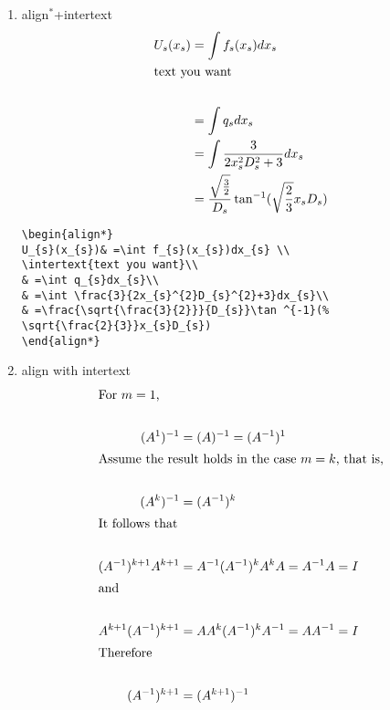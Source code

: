 \begin{enumerate}
\begin{lstlisting}[language=Tex]
\begin{equation*}
g(\lambda ,\nu )=
\begin{cases} -\lambda ^{T}h-\nu ^{T}b & c^{T}+\lambda ^{T}G+\nu ^{T}A=0
\\
-\infty &\text{otherwise.}
\end{cases}
\end{equation*}
\end{lstlisting}

\item align$^{\ast}$+intertext
\begin{align*}
U_{s}(x_{s})& =\int f_{s}(x_{s})dx_{s} \\
\intertext{text you want}\\
& =\int q_{s}dx_{s}\\
& =\int \frac{3}{2x_{s}^{2}D_{s}^{2}+3}dx_{s}\\
& =\frac{\sqrt{\frac{3}{2}}}{D_{s}}\tan ^{-1}(%
\sqrt{\frac{2}{3}}x_{s}D_{s})
\end{align*}

\begin{lstlisting}[language=Tex]
\begin{align*}
U_{s}(x_{s})& =\int f_{s}(x_{s})dx_{s} \\
\intertext{text you want}\\
& =\int q_{s}dx_{s}\\
& =\int \frac{3}{2x_{s}^{2}D_{s}^{2}+3}dx_{s}\\
& =\frac{\sqrt{\frac{3}{2}}}{D_{s}}\tan ^{-1}(%
\sqrt{\frac{2}{3}}x_{s}D_{s})
\end{align*}
\end{lstlisting}

\item align with intertext
\begin{align}
\intertext{For $m=1$,}\\
(A^{1})^{-1}& =(A)^{-1}=(A^{-1})^{1}\\
\intertext{Assume the result holds in the case $m=k$, that is,}\\
(A^{k})^{-1}& =(A^{-1})^{k}\\
\intertext{It follows that}\\
(A^{-1})^{k+1}A^{k+1}& =A^{-1}(A^{-1})^{k}A^{k}A=A^{-1}A=I\\
\intertext{and}\\
A^{k+1}(A^{-1})^{k+1}& =AA^{k}(A^{-1})^{k}A^{-1}=AA^{-1}=I\\
\intertext{Therefore}\\
(A^{-1})^{k+1}& =(A^{k+1})^{-1}
\end{align}


\end{enumerate}
